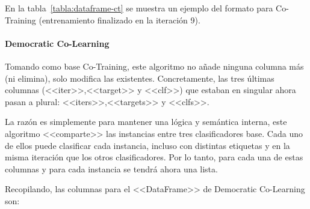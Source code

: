 En la tabla~\ref{tabla:dataframe-ct} se muestra un ejemplo del formato para
Co-Training (entrenamiento finalizado en la iteración 9).
\begin{table}[H]
    \caption{Ejemplo de DataFrame de Co-Training}
    \label{tabla:dataframe-ct}
\end{table}


\paragraph{Democratic Co-Learning}
Tomando como base Co-Training, este algoritmo no añade ninguna columna más (ni
elimina), solo modifica las existentes. Concretamente, las tres últimas columnas
(<<iter>>,<<target>> y <<clf>>) que estaban en singular ahora pasan a plural:
<<iters>>,<<targets>> y <<clfs>>. 

La razón es simplemente para mantener una lógica y semántica interna, este
algoritmo <<comparte>> las instancias entre tres clasificadores base. Cada uno
de ellos puede clasificar cada instancia, incluso con distintas etiquetas y en
la misma iteración que los otros clasificadores. Por lo tanto, para cada una de
estas columnas y para cada instancia se tendrá ahora una lista.

Recopilando, las columnas para el <<DataFrame>> de Democratic Co-Learning son:

